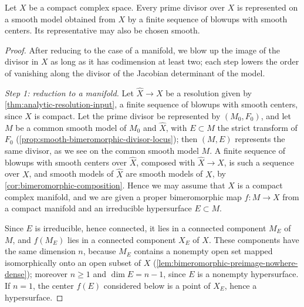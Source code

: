 \begin{theorem}\label{thm:divisor-smooth-blowup-realization}
Let $X$ be a compact complex space. Every prime divisor over $X$ is represented on a smooth model obtained from $X$ by a finite sequence of blowups with smooth centers. Its representative may also be chosen smooth.
\end{theorem}
\begin{proof}
After reducing to the case of a manifold, we blow up the image of the divisor in $X$ as long as it has codimension at least two; each step lowers the order of vanishing along the divisor of the Jacobian determinant of the model.

\emph{Step 1: reduction to a manifold.} Let $\widehat X\to X$ be a resolution given by \cref{thm:analytic-resolution-input}, a finite sequence of blowups with smooth centers, since $X$ is compact. Let the prime divisor be represented by $(M_0,F_0)$, and let $M$ be a common smooth model of $M_0$ and $\widehat X$, with $E\subset M$ the strict transform of $F_0$ (\cref{prop:smooth-bimeromorphic-divisor-locus}); then $(M,E)$ represents the same divisor, as we see on the common smooth model $M$. A finite sequence of blowups with smooth centers over $\widehat X$, composed with $\widehat X\to X$, is such a sequence over $X$, and smooth models of $\widehat X$ are smooth models of $X$, by \cref{cor:bimeromorphic-composition}. Hence we may assume that $X$ is a compact complex manifold, and we are given a proper bimeromorphic map $f\colon M\to X$ from a compact manifold and an irreducible hypersurface $E\subset M$.

Since $E$ is irreducible, hence connected, it lies in a connected component $M_E$ of $M$, and $f(M_E)$ lies in a connected component $X_E$ of $X$. These components have the same dimension $n$, because $M_E$ contains a nonempty open set mapped isomorphically onto an open subset of $X$ (\cref{lem:bimeromorphic-preimage-nowhere-dense}); moreover $n\geq1$ and $\dim E=n-1$, since $E$ is a nonempty hypersurface. If $n=1$, the center $f(E)$ considered below is a point of $X_E$, hence a hypersurface.


\end{proof}
